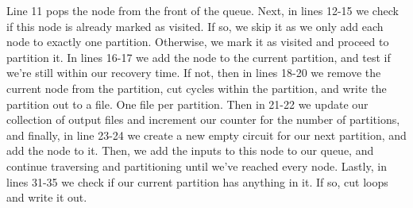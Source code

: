 \documentclass[12pt,draft,oneside]{article} %
\begin{document}
Line 11 pops the node from the front of the queue.
Next, in lines 12-15 we check if this node is already marked as visited. If so, we skip it as we only add each node to exactly one partition. Otherwise, we mark it as visited and proceed to partition it.
In lines 16-17 we add the node to the current partition, and test if we're still within our recovery time.
If not, then in lines 18-20 we remove the current node from the partition, cut cycles within the partition, and write the partition out to a file. One file per partition.
Then in 21-22 we update our collection of output files and increment our counter for the number of partitions, and finally, in line 23-24 we create a new empty circuit for our next partition, and add the node to it.
Then, we add the inputs to this node to our queue, and continue traversing and partitioning until we've reached every node.
Lastly, in lines 31-35 we check if our current partition has anything in it. If so, cut loops and write it out.

\newpage
\end{document}
